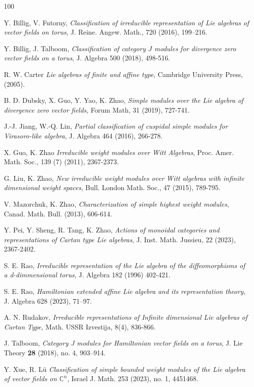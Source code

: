 \documentclass[a4paper,11pt]{amsart}
\numberwithin{equation}{section}
\theoremstyle{plain}
\newcommand{\C}{\mathbb{C}}
\begin{document}
 
	\begin{thebibliography}{100}{
            Y. Billig, V. Futorny, \emph{Classification of irreducible representation of Lie algebras of vector fields on torus}, J. Reine. Angew. Math.,  720 (2016), 199–216.

           Y. Billig, J. Talboom, \emph{Classification of category $J$
 modules for divergence zero vector fields on a torus}, J. Algebra 500 (2018), 498-516.

        
           R. W. Carter \emph{Lie algebras of finite and affine type}, Cambridge University Press, (2005).
          
                  B. D. Dubsky, X. Guo, Y. Yao, K. Zhao, \emph{Simple modules over the Lie algebra of divergence zero vector fields,} Forum Math, 31 (2019), 727-741.
                 
 J.-J. Jiang, W.-Q. Lin, \emph{Partial classification of cuspidal simple modules for Virasoro-like algebra}, J. Algebra 464 (2016),  266-278.

                  X. Guo, K. Zhao \emph{Irreducible weight modules over Witt Algebras}, Proc. Amer. Math. Soc., 139 (7) (2011), 2367-2373.
                 
            G. Liu, K. Zhao, \emph{New irreducible weight modules over Witt algebras with infinite dimensional weight spaces}, Bull. London Math. Soc., 47 (2015), 789-795.
          
           V. Mazorchuk, K. Zhao, \emph{Characterization of simple highest weight modules}, Canad. Math. Bull. (2013), 606-614. 

           Y. Pei, Y. Sheng, R. Tang, K. Zhao, \emph{Actions of monoidal categories and representations of Cartan type Lie algebras}, J. Inst. Math. Jussieu, 22 (2023), 2367-2402.
          
           S. E. Rao, \emph{Irreducible representation of the Lie algebra of the diffeomorphisms of a d-dimmensional torus}, J. Algebra 182 (1996) 402-421.
          
            S. E. Rao, \emph{Hamiltonian extended affine Lie algebra and its representation theory,} J. Algebra   628 (2023), 71–97. 
           
           A. N. Rudakov, \emph{Irreducible representations of Infinite dimensional Lie algebras of Cartan Type,} Math. USSR Izvestija, 8(4), 836-866. 
         
		 J. Talboom, \emph{Category J modules for Hamiltonian vector fields on a torus}, J. Lie Theory {\bf 28} (2018), no. 4, 903–914.  
        
       Y. Xue,  R. Lü \emph{Classification of simple bounded weight modules of the Lie algebra of vector fields on $\C^n$,} Israel J. Math. 253 (2023), no. 1, 4451468. 
      
      
      }
    \end{thebibliography}	
	
\end{document}
